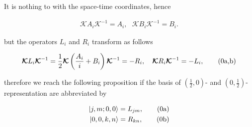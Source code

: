 \documentclass[12pt]{beamer}
\newcommand{\stag}[1]{\tag{\arabic{equation}#1}}
\newcommand{\ket}[1]{|#1\rangle }
\newcommand{\Kappa}[0]{\bm{\mathcal{K}}}
\begin{document}
\begin{frame}
It is nothing to with the space-time coordinates, hence 


\begin{align}
\Kappa A_i\Kappa^{-1}=A_i,~~~\Kappa B_i\Kappa^{-1}=B_i.
\end{align}

\noindnet but the operators $ L_i $ and $ R_i $ transform as follows

\addtocounter{equation}{1}
\begin{align*}
\Kappa L_i\Kappa^{-1}=\frac{1}{2}\Kappa\left(\frac{A_i}{i}+B_i\right)\Kappa^{-1}=-R_i,~~~
\Kappa R_i\Kappa^{-1}=-L_i,\stag{a,b}
\end{align*}

\noindent therefore we reach the following proposition if the basis of $ (\frac{1}{2},0) $- and $ (0,\frac{1}{2}) $-representation are abbreviated by

\addtocounter{equation}{1}
\begin{align*}
\ket{j,m;0,0}=L_{jm},\stag{a}\\
\ket{0,0,k,n}=R_{kn},\stag{b}
\end{align*}
\end{frame}
\end{document}
